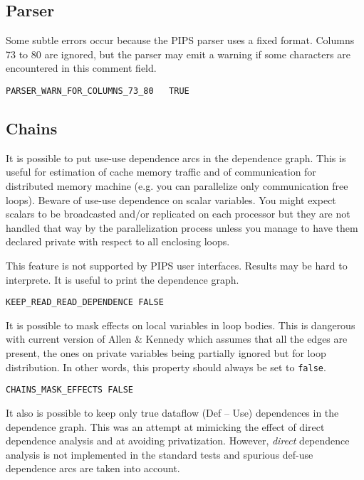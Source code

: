 \subsection{Parser}

Some subtle errors occur because the PIPS parser uses a fixed
format. Columns 73 to 80 are ignored, but the parser may emit a warning
if some characters are encountered in this comment field.

\begin{verbatim}
PARSER_WARN_FOR_COLUMNS_73_80   TRUE
\end{verbatim}

\subsection{Chains}

It is possible to put use-use dependence arcs in the dependence graph.
This is useful for estimation of cache memory traffic and of
communication for distributed memory machine (e.g. you can parallelize
only communication free loops). Beware of use-use dependence on scalar
variables. You might expect scalars to be broadcasted and/or replicated
on each processor but they are not handled that way by the
parallelization process unless you manage to have them
declared private with respect to all enclosing loops.

This feature is not supported by PIPS user interfaces. Results may be
hard to interprete. It is useful to print the dependence graph.

\begin{verbatim}
KEEP_READ_READ_DEPENDENCE FALSE
\end{verbatim}

It is possible to mask effects on local variables in loop bodies. This
is dangerous with current version of Allen \& Kennedy which assumes that
all the edges are present, the ones on private variables being
partially ignored but for loop distribution. In other words, this
property should always be set to \verb+false+.

\begin{verbatim}
CHAINS_MASK_EFFECTS FALSE
\end{verbatim}

It also is possible to keep only true dataflow (Def -- Use) dependences in
the dependence graph. This was an attempt at mimicking the effect of
direct dependence analysis and at avoiding privatization. However, {\em
direct} dependence analysis is not implemented in the standard tests and
spurious def-use dependence arcs are taken into account.

